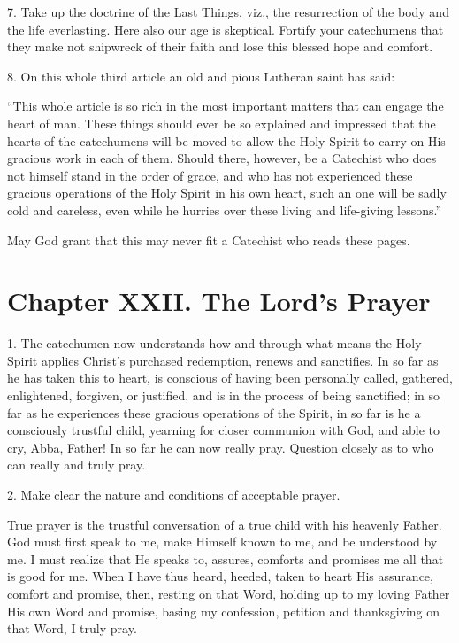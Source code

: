  7. Take up the doctrine of the Last Things, viz., the resurrection of the body and the life everlasting. Here also our age is skeptical. Fortify your catechumens that they make not shipwreck of their faith and lose this blessed hope and comfort.

 8. On this whole third article an old and pious Lutheran saint has said:

“This whole article is so rich in the most important matters that can engage the heart of man. These things should ever be so explained and impressed that the hearts of the catechumens will be moved to allow the Holy Spirit to carry on His gracious work in each of them. Should there, however, be a Catechist who does not himself stand in the order of grace, and who has not experienced these gracious operations of the Holy Spirit in his own heart, such an one will be sadly cold and careless, even while he hurries over these living and life-giving lessons.”

May God grant that this may never fit a Catechist who reads these pages.

\chapter{Chapter XXII. The Lord’s Prayer}

1. The catechumen now understands how and through what means the Holy Spirit applies Christ’s purchased redemption, renews and sanctifies. In so far as he has taken this to heart, is conscious of having been personally called, gathered, enlightened, forgiven, or justified, and is in the process of being sanctified; in so far as he experiences these gracious operations of the Spirit, in so far is he a consciously trustful child, yearning for closer communion with God, and able to cry, Abba, Father!  In so far he can now really pray. Question closely as to who can really and truly pray.

2. Make clear the nature and conditions of acceptable prayer.

 True prayer is the trustful conversation of a true child with his heavenly Father. God must first speak to me, make Himself known to me, and be understood by me. I must realize that He speaks to, assures, comforts and promises me all that is good for me. When I have thus heard, heeded, taken to heart His assurance, comfort and promise, then, resting on that Word, holding up to my loving Father His own Word and promise, basing my confession,
petition and thanksgiving on that Word, I truly pray.

